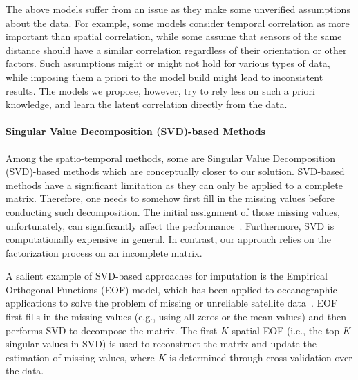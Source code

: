 The above models suffer from an issue as they make some unverified assumptions about the data. For example, some models consider temporal correlation as more important than spatial correlation,
while some assume that sensors of the same distance should have a similar correlation regardless of their 
orientation or other factors.  Such assumptions might or might not hold for various types of data, while imposing them a priori
to the model build might lead to inconsistent results.  The models we propose, however, try to rely less on such a priori 
knowledge, and learn the latent correlation directly from the data.  

\paragraph{Singular Value Decomposition (SVD)-based Methods}
Among the spatio-temporal methods, some are Singular Value Decomposition (SVD)-based methods which are conceptually closer to our
solution. 
SVD-based methods have a significant limitation as they can only be applied to a complete matrix.
Therefore, one needs to somehow first fill in the missing values before conducting such decomposition.
The initial assignment of those missing values, unfortunately, can significantly affect the performance~\cite{koren2009matrix}.
Furthermore, SVD is computationally expensive in general.
In contrast, our approach relies on the factorization process on an incomplete matrix.


A salient example of SVD-based approaches for imputation is the Empirical Orthogonal Functions
(EOF) model, which has been applied to oceanographic applications to
solve the problem of missing or unreliable satellite
data~\cite{beckers2003eof}.  EOF first fills in the missing values
(e.g., using all zeros or the mean values) and then performs SVD 
to decompose the matrix. The first $K$ spatial-EOF (i.e., the top-$K$
singular values in SVD) is used to reconstruct the matrix and update the estimation of missing values, 
where $K$ is determined through cross validation over the data.

